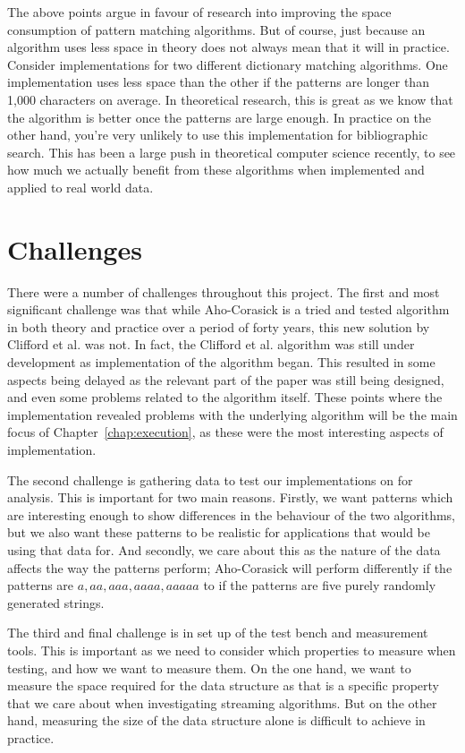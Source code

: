 \documentclass[ %
                    author={Dominic Joseph Moylett},
                    degree={MEng},
                     title={Dictionary Matching with Fingerprints},
                  subtitle={An Empirical Analysis},
                      type={research},
                      year={2015} ]{dissertation}
\begin{document}
The above points argue in favour of research into improving the space consumption of pattern matching algorithms. But of course, just because an algorithm uses less space in theory does not always mean that it will in practice. Consider implementations for two different dictionary matching algorithms. One implementation uses less space than the other if the patterns are longer than 1,000 characters on average. In theoretical research, this is great as we know that the algorithm is better once the patterns are large enough. In practice on the other hand, you're very unlikely to use this implementation for bibliographic search. This has been a large push in theoretical computer science recently, to see how much we actually benefit from these algorithms when implemented and applied to real world data.

\section{Challenges}

There were a number of challenges throughout this project. The first and most significant challenge was that while Aho-Corasick is a tried and tested algorithm in both theory and practice over a period of forty years, this new solution by Clifford et al. was not. In fact, the Clifford et al. algorithm was still under development as implementation of the algorithm began. This resulted in some aspects being delayed as the relevant part of the paper was still being designed, and even some problems related to the algorithm itself. These points where the implementation revealed problems with the underlying algorithm will be the main focus of Chapter~\ref{chap:execution}, as these were the most interesting aspects of implementation.

The second challenge is gathering data to test our implementations on for analysis. This is important for two main reasons. Firstly, we want patterns which are interesting enough to show differences in the behaviour of the two algorithms, but we also want these patterns to be realistic for applications that would be using that data for. And secondly, we care about this as the nature of the data affects the way the patterns perform; Aho-Corasick will perform differently if the patterns are $a, aa, aaa, aaaa, aaaaa$ to if the patterns are five purely randomly generated strings.

The third and final challenge is in set up of the test bench and measurement tools. This is important as we need to consider which properties to measure when testing, and how we want to measure them. On the one hand, we want to measure the space required for the data structure as that is a specific property that we care about when investigating streaming algorithms. But on the other hand, measuring the size of the data structure alone is difficult to achieve in practice.
\end{document}
